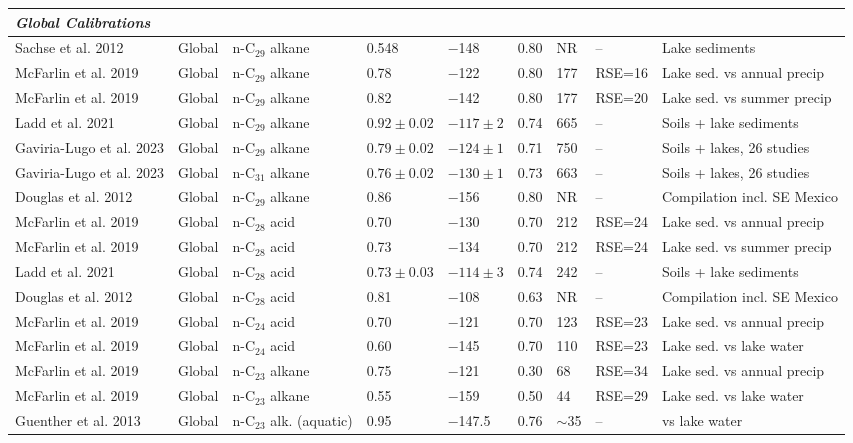 \documentclass[11pt]{article}
\begin{document}
\begin{longtable}{@{}p{3.5cm}p{3.2cm}p{3.5cm}p{1.5cm}p{1.5cm}p{0.8cm}p{0.9cm}p{1.3cm}p{3.8cm}@{}}
\multicolumn{9}{l}{\textit{Global Calibrations}} \\
\midrule
Sachse et al. 2012 & Global & n-C$_{29}$ alkane & 0.548 & $-$148 & 0.80 & NR & -- & Lake sediments \\
McFarlin et al. 2019 & Global & n-C$_{29}$ alkane & 0.78 & $-$122 & 0.80 & 177 & RSE=16 & Lake sed. vs annual precip \\
McFarlin et al. 2019 & Global & n-C$_{29}$ alkane & 0.82 & $-$142 & 0.80 & 177 & RSE=20 & Lake sed. vs summer precip \\
Ladd et al. 2021 & Global & n-C$_{29}$ alkane & $0.92\pm0.02$ & $-117\pm2$ & 0.74 & 665 & -- & Soils + lake sediments \\
Gaviria-Lugo et al. 2023 & Global & n-C$_{29}$ alkane & $0.79\pm0.02$ & $-124\pm1$ & 0.71 & 750 & -- & Soils + lakes, 26 studies \\
Gaviria-Lugo et al. 2023 & Global & n-C$_{31}$ alkane & $0.76\pm0.02$ & $-130\pm1$ & 0.73 & 663 & -- & Soils + lakes, 26 studies \\
Douglas et al. 2012 & Global & n-C$_{29}$ alkane & 0.86 & $-$156 & 0.80 & NR & -- & Compilation incl. SE Mexico \\
McFarlin et al. 2019 & Global & n-C$_{28}$ acid & 0.70 & $-$130 & 0.70 & 212 & RSE=24 & Lake sed. vs annual precip \\
McFarlin et al. 2019 & Global & n-C$_{28}$ acid & 0.73 & $-$134 & 0.70 & 212 & RSE=24 & Lake sed. vs summer precip \\
Ladd et al. 2021 & Global & n-C$_{28}$ acid & $0.73\pm0.03$ & $-114\pm3$ & 0.74 & 242 & -- & Soils + lake sediments \\
Douglas et al. 2012 & Global & n-C$_{28}$ acid & 0.81 & $-$108 & 0.63 & NR & -- & Compilation incl. SE Mexico \\
McFarlin et al. 2019 & Global & n-C$_{24}$ acid & 0.70 & $-$121 & 0.70 & 123 & RSE=23 & Lake sed. vs annual precip \\
McFarlin et al. 2019 & Global & n-C$_{24}$ acid & 0.60 & $-$145 & 0.70 & 110 & RSE=23 & Lake sed. vs lake water \\
McFarlin et al. 2019 & Global & n-C$_{23}$ alkane & 0.75 & $-$121 & 0.30 & 68 & RSE=34 & Lake sed. vs annual precip \\
McFarlin et al. 2019 & Global & n-C$_{23}$ alkane & 0.55 & $-$159 & 0.50 & 44 & RSE=29 & Lake sed. vs lake water \\
Guenther et al. 2013 & Global & n-C$_{23}$ alk. (aquatic) & 0.95 & $-$147.5 & 0.76 & $\sim$35 & -- & vs lake water \\

\end{longtable}
\end{document}
